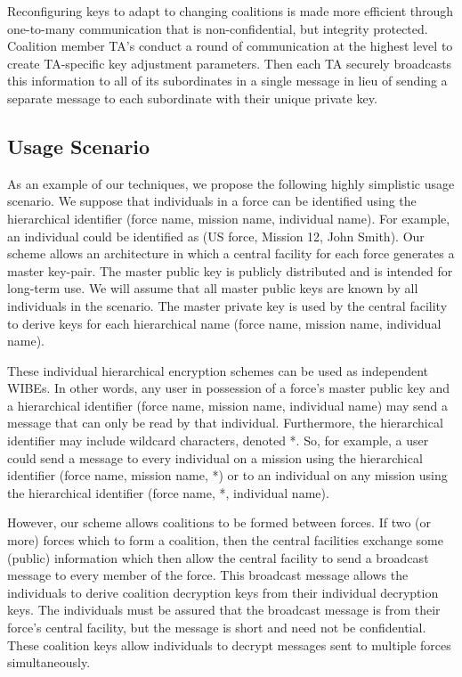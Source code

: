 \documentclass[10pt]{llncs}
\begin{document}
	Reconfiguring keys to adapt to changing coalitions is made more efficient through  one-to-many communication that is non-confidential, but integrity protected. Coalition member TA's conduct a round of communication at the highest level to create TA-specific key adjustment parameters. Then each TA securely broadcasts this information to all of its subordinates in a single message in lieu of sending a separate message to each subordinate with their unique private key.

\subsection{Usage Scenario}

As an example of our techniques, we propose the following highly simplistic usage scenario. We suppose that individuals in a force can be identified using the hierarchical identifier (force name, mission name, individual name). For example, an individual could be identified as (US force, Mission 12, John Smith). Our scheme allows an architecture in which a central facility for each force generates a master key-pair. The master public key is publicly distributed and is intended for long-term use. We will assume that all master public keys are known by all individuals in the scenario. The master private key is used by the central facility to derive keys for each hierarchical name (force name, mission name, individual name).

These individual hierarchical encryption schemes can be used as independent WIBEs. In other words, any user in possession of a force's master public key and a hierarchical identifier (force name, mission name, individual name) may send a message that can only be read by that individual. Furthermore, the hierarchical identifier may include wildcard characters, denoted *. So, for example, a user could send a message to every individual on a mission using the hierarchical identifier (force name, mission name, *) or to an individual on any mission using the hierarchical identifier (force name, *, individual name).

However, our scheme allows coalitions to be formed between forces. If two (or more) forces which to form a coalition, then the central facilities exchange some (public) information which then allow the central facility to send a broadcast message to every member of the force. This broadcast message allows the individuals to derive coalition decryption keys from their individual decryption keys. The individuals must be assured that the broadcast message is from their force's central facility, but the message is short and need not be confidential. These coalition keys allow individuals to decrypt messages sent to multiple forces simultaneously.
\end{document}
